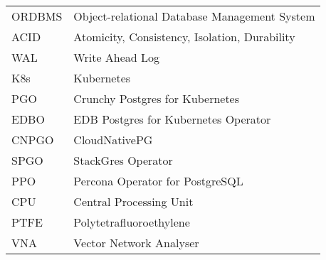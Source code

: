 
\seznamzkr

\begin{tabular}{ll}
  ORDBMS & Object-relational Database Management System  \\
  ACID   & Atomicity, Consistency, Isolation, Durability \\
  WAL    & Write Ahead Log                               \\
  K8s    & Kubernetes                                    \\
  PGO    & Crunchy Postgres for Kubernetes               \\
  EDBO   & EDB Postgres for Kubernetes Operator          \\
  CNPGO  & CloudNativePG                                 \\
  SPGO   & StackGres Operator                            \\
  PPO    & Percona Operator for PostgreSQL               \\
  CPU    & Central Processing Unit                       \\
  PTFE   & Polytetrafluoroethylene                       \\
  VNA    & Vector Network Analyser                       \\
\end{tabular}


